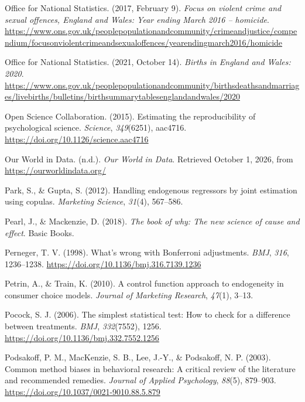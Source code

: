 \documentclass[
]{book}
\newlength{\cslhangindent}
\newenvironment{CSLReferences}[2] %
 {\begin{list}{}{%
  \setlength{\itemindent}{0pt}
  \setlength{\leftmargin}{0pt}
  \setlength{\parsep}{0pt}
  \ifodd #1
   \setlength{\leftmargin}{\cslhangindent}
   \setlength{\itemindent}{-1\cslhangindent}
  \fi
  \setlength{\itemsep}{#2\baselineskip}}}
 {\end{list}}
\begin{document}
\begin{CSLReferences}{1}{0}
Office for National Statistics. (2017, February 9). \emph{Focus on violent crime and sexual offences, {England} and {Wales}: Year ending {March} 2016 -- homicide}. \url{https://www.ons.gov.uk/peoplepopulationandcommunity/crimeandjustice/compendium/focusonviolentcrimeandsexualoffences/yearendingmarch2016/homicide}

Office for National Statistics. (2021, October 14). \emph{Births in {England} and {Wales}: 2020}. \url{https://www.ons.gov.uk/peoplepopulationandcommunity/birthsdeathsandmarriages/livebirths/bulletins/birthsummarytablesenglandandwales/2020}

Open Science Collaboration. (2015). Estimating the reproducibility of psychological science. \emph{Science}, \emph{349}(6251), aac4716. \url{https://doi.org/10.1126/science.aac4716}

Our World in Data. (n.d.). \emph{{Our World in Data}}. Retrieved October 1, 2026, from \url{https://ourworldindata.org/}

Park, S., \& Gupta, S. (2012). Handling endogenous regressors by joint estimation using copulas. \emph{Marketing Science}, \emph{31}(4), 567--586.

Pearl, J., \& Mackenzie, D. (2018). \emph{The book of why: The new science of cause and effect}. Basic Books.

Perneger, T. V. (1998). What's wrong with {B}onferroni adjustments. \emph{BMJ}, \emph{316}, 1236--1238. \url{https://doi.org/10.1136/bmj.316.7139.1236}

Petrin, A., \& Train, K. (2010). A control function approach to endogeneity in consumer choice models. \emph{Journal of Marketing Research}, \emph{47}(1), 3--13.

Pocock, S. J. (2006). The simplest statistical test: How to check for a difference between treatments. \emph{BMJ}, \emph{332}(7552), 1256. \url{https://doi.org/10.1136/bmj.332.7552.1256}

Podsakoff, P. M., MacKenzie, S. B., Lee, J.-Y., \& Podsakoff, N. P. (2003). Common method biases in behavioral research: A critical review of the literature and recommended remedies. \emph{Journal of Applied Psychology}, \emph{88}(5), 879--903. \url{https://doi.org/10.1037/0021-9010.88.5.879}


\end{CSLReferences}
\end{document}
